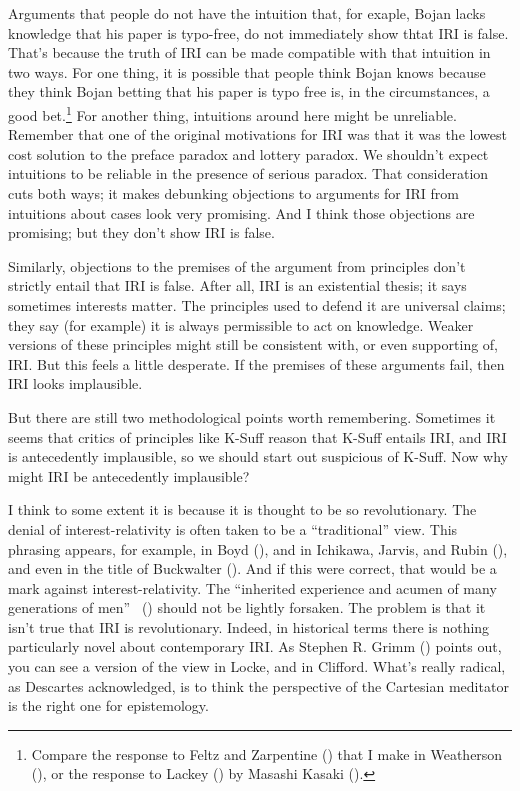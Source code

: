 \documentclass[
  11pt,
  letterpaper,
  DIV=11,
  numbers=noendperiod,
  twoside]{scrartcl}
\begin{document}
Arguments that people do not have the intuition that, for exaple, Bojan
lacks knowledge that his paper is typo-free, do not immediately show
thtat IRI is false. That's because the truth of IRI can be made
compatible with that intuition in two ways. For one thing, it is
possible that people think Bojan knows because they think Bojan betting
that his paper is typo free is, in the circumstances, a good
bet.\footnote{Compare the response to Feltz and Zarpentine
  () that I make in Weatherson
  (), or the response
  to Lackey () by Masashi Kasaki
  ().} For another thing,
intuitions around here might be unreliable. Remember that one of the
original motivations for IRI was that it was the lowest cost solution to
the preface paradox and lottery paradox. We shouldn't expect intuitions
to be reliable in the presence of serious paradox. That consideration
cuts both ways; it makes debunking objections to arguments for IRI from
intuitions about cases look very promising. And I think those objections
are promising; but they don't show IRI is false.

Similarly, objections to the premises of the argument from principles
don't strictly entail that IRI is false. After all, IRI is an
existential thesis; it says sometimes interests matter. The principles
used to defend it are universal claims; they say (for example) it is
always permissible to act on knowledge. Weaker versions of these
principles might still be consistent with, or even supporting of, IRI.
But this feels a little desperate. If the premises of these arguments
fail, then IRI looks implausible.

But there are still two methodological points worth remembering.
Sometimes it seems that critics of principles like K-Suff reason that
K-Suff entails IRI, and IRI is antecedently implausible, so we should
start out suspicious of K-Suff. Now why might IRI be antecedently
implausible?

I think to some extent it is because it is thought to be so
revolutionary. The denial of interest-relativity is often taken to be a
``traditional'' view. This phrasing appears, for example, in Boyd
(), and in Ichikawa, Jarvis, and Rubin
(), and even in the title of
Buckwalter (). And if this were
correct, that would be a mark against interest-relativity. The
``inherited experience and acumen of many generations of men''
~() should not be lightly
forsaken. The problem is that it isn't true that IRI is revolutionary.
Indeed, in historical terms there is nothing particularly novel about
contemporary IRI. As Stephen R. Grimm ()
points out, you can see a version of the view in Locke, and in Clifford.
What's really radical, as Descartes acknowledged, is to think the
perspective of the Cartesian meditator is the right one for
epistemology.
\end{document}
